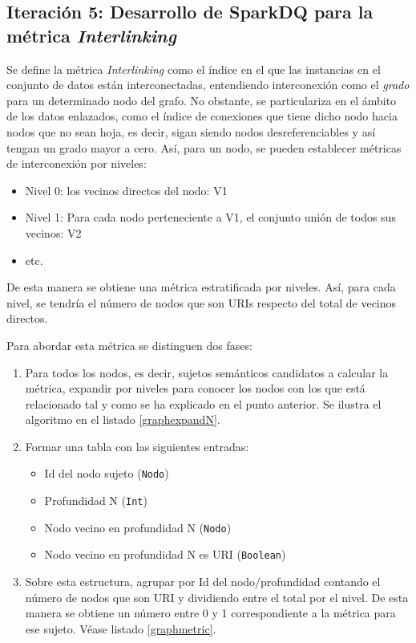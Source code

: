 \subsection{Iteración 5: Desarrollo de SparkDQ para la métrica \textit{Interlinking}}
\label{iteracion5}


Se define la métrica \textit{Interlinking} como el índice en el que las
instancias en el conjunto de datos están interconectadas, entendiendo
interconexión como el \textit{grado} para un determinado nodo del grafo. No
obstante, se particulariza en el ámbito de los datos enlazados, como el índice de
conexiones que tiene dicho nodo hacia nodos que no sean hoja, es decir, sigan
siendo nodos desreferenciables y así tengan un grado mayor a cero. Así,
para un nodo, se pueden establecer métricas de
interconexión por niveles:

\begin{itemize}
\item Nivel 0: los vecinos directos del nodo: V1 
\item Nivel 1: Para cada nodo perteneciente a V1, el conjunto unión de todos sus
  vecinos: V2
\item etc. 
\end{itemize}

De esta manera se obtiene una métrica estratificada por niveles. Así, para cada nivel, se
tendría el número de nodos que son URIs respecto del total de vecinos directos. 

Para abordar esta métrica se distinguen dos fases: 

\begin{enumerate}
\item Para todos los nodos, es decir, sujetos semánticos candidatos a calcular
  la métrica, expandir por niveles para conocer los nodos con los que está
  relacionado tal y como se ha explicado en el punto anterior. Se ilustra el
  algoritmo en el listado \ref{graphexpandN}. 

\item Formar una tabla con las siguientes entradas: 
  \begin{itemize}
  \item Id del nodo sujeto (\texttt{Nodo})
  \item Profundidad N (\texttt{Int})
  \item Nodo vecino en profundidad N (\texttt{Nodo})
  \item Nodo vecino en profundidad N es URI (\texttt{Boolean})
  \end{itemize}
\item Sobre esta estructura, agrupar por Id del nodo/profundidad contando el
  número de nodos que son URI y dividiendo entre el total por el nivel. De esta
  manera se obtiene un número entre 0 y 1 correspondiente a la métrica para ese
  sujeto. Véase listado \ref{graphmetric}.
\end{enumerate}

